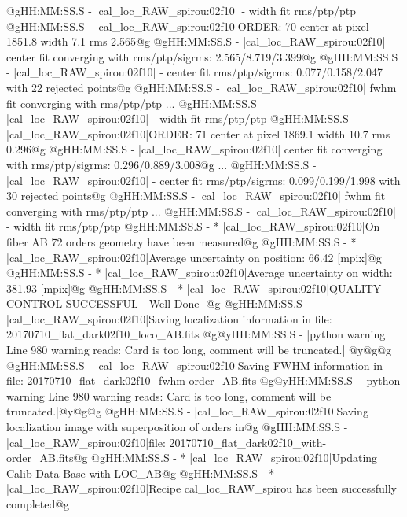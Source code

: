 \begin{cmdboxprintspecial}[fontupper=\tiny, fontlower=\tiny]
@gHH:MM:SS.S -   |cal_loc_RAW_spirou:02f10| - width  fit rms/ptp/ptp%
@gHH:MM:SS.S -   |cal_loc_RAW_spirou:02f10|ORDER: 70 center at pixel 1851.8 width 7.1 rms 2.565@g
@gHH:MM:SS.S -   |cal_loc_RAW_spirou:02f10|      center fit converging with rms/ptp/sigrms: 2.565/8.719/3.399@g
@gHH:MM:SS.S -   |cal_loc_RAW_spirou:02f10| - center fit rms/ptp/sigrms: 0.077/0.158/2.047 with 22 rejected points@g
@gHH:MM:SS.S -   |cal_loc_RAW_spirou:02f10|      fwhm fit converging with rms/ptp/ptp%
...
@gHH:MM:SS.S -   |cal_loc_RAW_spirou:02f10| - width  fit rms/ptp/ptp%
@gHH:MM:SS.S -   |cal_loc_RAW_spirou:02f10|ORDER: 71 center at pixel 1869.1 width 10.7 rms 0.296@g
@gHH:MM:SS.S -   |cal_loc_RAW_spirou:02f10|      center fit converging with rms/ptp/sigrms: 0.296/0.889/3.008@g
...
@gHH:MM:SS.S -   |cal_loc_RAW_spirou:02f10| - center fit rms/ptp/sigrms: 0.099/0.199/1.998 with 30 rejected points@g
@gHH:MM:SS.S -   |cal_loc_RAW_spirou:02f10|      fwhm fit converging with rms/ptp/ptp%
...
@gHH:MM:SS.S -   |cal_loc_RAW_spirou:02f10| - width  fit rms/ptp/ptp%
@gHH:MM:SS.S - * |cal_loc_RAW_spirou:02f10|On fiber AB 72 orders geometry have been measured@g
@gHH:MM:SS.S - * |cal_loc_RAW_spirou:02f10|Average uncertainty on position: 66.42 [mpix]@g
@gHH:MM:SS.S - * |cal_loc_RAW_spirou:02f10|Average uncertainty on width: 381.93 [mpix]@g
@gHH:MM:SS.S - * |cal_loc_RAW_spirou:02f10|QUALITY CONTROL SUCCESSFUL - Well Done -@g
@gHH:MM:SS.S -   |cal_loc_RAW_spirou:02f10|Saving localization information in file: 20170710_flat_dark02f10_loco_AB.fits
@g@yHH:MM:SS.S - \@ |python warning Line 980  warning reads: Card is too long, comment will be truncated.| @y@g@g
@gHH:MM:SS.S -   |cal_loc_RAW_spirou:02f10|Saving FWHM information in file: 20170710_flat_dark02f10_fwhm-order_AB.fits
@g@yHH:MM:SS.S - \@ |python warning Line 980  warning reads: Card is too long, comment will be truncated.|@y@g@g
@gHH:MM:SS.S -   |cal_loc_RAW_spirou:02f10|Saving localization image with superposition of orders in@g
@gHH:MM:SS.S -   |cal_loc_RAW_spirou:02f10|file: 20170710_flat_dark02f10_with-order_AB.fits@g
@gHH:MM:SS.S - * |cal_loc_RAW_spirou:02f10|Updating Calib Data Base with LOC_AB@g
@gHH:MM:SS.S - * |cal_loc_RAW_spirou:02f10|Recipe cal_loc_RAW_spirou has been successfully completed@g
\end{cmdboxprintspecial}




